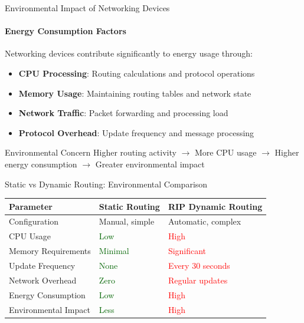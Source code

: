 \documentclass[aspectratio=169]{beamer}
\begin{document}
\begin{frame}{Environmental Impact of Networking Devices}
    \framesubtitle{Energy Consumption Factors}
    
    Networking devices contribute significantly to energy usage through:
    \begin{itemize}
        \item \textbf{CPU Processing}: Routing calculations and protocol operations
        \item \textbf{Memory Usage}: Maintaining routing tables and network state
        \item \textbf{Network Traffic}: Packet forwarding and processing load
        \item \textbf{Protocol Overhead}: Update frequency and message processing
    \end{itemize}
 
    \begin{alertblock}{Environmental Concern}
        \vspace{0.1cm}
        Higher routing activity $\rightarrow$ More CPU usage $\rightarrow$ Higher energy consumption $\rightarrow$ Greater environmental impact
    \end{alertblock}
\end{frame}

\begin{frame}{Static vs Dynamic Routing: Environmental Comparison}
    \small
    \begin{table}
    \centering
    \begin{tabular}{|p{2.2cm}|p{2.8cm}|p{3.2cm}|}
    \hline
    \textbf{Parameter} & \textbf{Static Routing} & \textbf{RIP Dynamic Routing} \\ \hline
    Configuration & Manual, simple & Automatic, complex \\ \hline
    CPU Usage & \textcolor{DarkGreen}{Low} & \textcolor{red}{High} \\ \hline
    Memory Requirements & \textcolor{DarkGreen}{Minimal} & \textcolor{red}{Significant} \\ \hline
    Update Frequency & \textcolor{DarkGreen}{None} & \textcolor{red}{Every 30 seconds} \\ \hline
    Network Overhead & \textcolor{DarkGreen}{Zero} & \textcolor{red}{Regular updates} \\ \hline
    Energy Consumption & \textcolor{DarkGreen}{Low} & \textcolor{red}{High} \\ \hline
    Environmental Impact & \textcolor{DarkGreen}{Less} & \textcolor{red}{High} \\ \hline
    \end{tabular}
    \end{table}
\end{frame}
\end{document}
